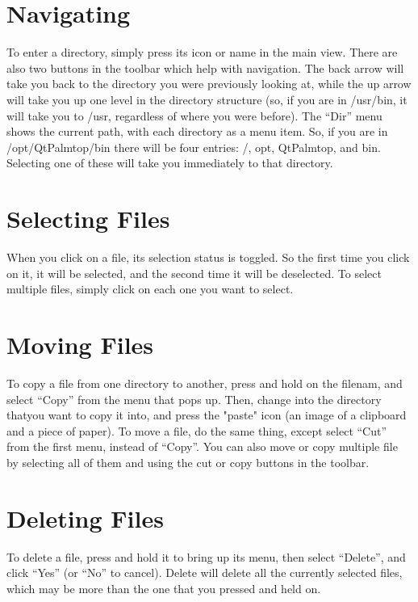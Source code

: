\documentclass[12pt,letterpaper,oneside, openany]{book} \usepackage[latin1] {inputenc}
\begin{document}
\section{Navigating }

To enter a directory, simply press its icon or name in the main view. There are also two buttons in the toolbar which help with navigation. The back arrow will take you back to the directory you were previously looking at, while the up arrow will take you up one level in the directory structure (so, if you are in /usr/bin, it will take you to /usr, regardless of where you were before). The ``Dir'' menu shows the current path, with each directory as a menu item. So, if you are in /opt/QtPalmtop/bin there will be four entries: /, opt, QtPalmtop, and bin. Selecting one of these will take you immediately to that directory. 

\section{Selecting Files}

When you click on a file, its selection status is toggled. So the first time you click on it, it will be selected, and the second time it will be deselected. To select multiple files, simply click on each one you want to select. 

\section{Moving Files}

To copy a file from one directory to another, press and hold on the filenam, and select ``Copy'' from the menu that pops up. Then, change into the directory thatyou want to copy it into, and press the "paste" icon (an image of a clipboard and a piece of paper). To move a file, do the same thing, except select ``Cut'' from the first menu, instead of ``Copy''. You can also move or copy multiple file by selecting all of them and using the cut or copy buttons in the toolbar. 

\section{Deleting Files}

To delete a file, press and hold it to bring up its menu, then select ``Delete'', and click ``Yes'' (or ``No'' to cancel). Delete will delete all the currently selected files, which may be more than the one that you pressed and held on. 
\end{document}
